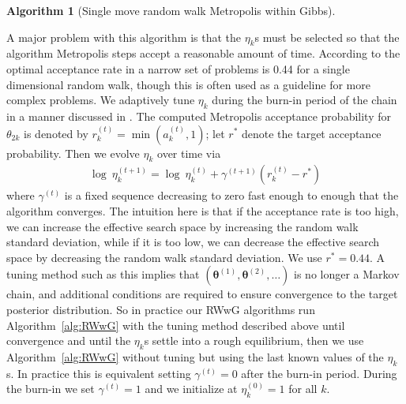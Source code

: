 \documentclass[12pt]{article}
\newtheorem{alg}{Algorithm}
\begin{document}
\begin{appendix}
\begin{alg}[Single move random walk Metropolis within Gibbs]
\begin{enumerate}
\begin{itemize}
\end{itemize}
\end{enumerate}
\end{alg}
A major problem with this algorithm is that the $\eta_k$s must be selected so that the algorithm Metropolis steps accept a reasonable amount of time. According to \citet{gelman1996efficient} the optimal acceptance rate in a narrow set of problems is 0.44 for a single dimensional random walk, though this is often used as a guideline for more complex problems. We adaptively tune $\eta_k$ during the burn-in period of the chain in a manner discussed in \citet{andrieu2008tutorial}. The computed Metropolis acceptance probability for $\theta_{2k}$ is denoted by $r_{k}^{(t)} = \min(a_k^{(t)}, 1)$; let $r^*$ denote the target acceptance probability. Then we evolve $\eta_k$ over time via
\begin{align*}
\log\ \eta_{k}^{(t+1)} = \log\ \eta_{k}^{(t)} + \gamma^{(t+1)}(r_k^{(t)} - r^*)
\end{align*}
where $\gamma^{(t)}$ is a fixed sequence decreasing to zero fast enough to enough that the algorithm converges. The intuition here is that if the acceptance rate is too high, we can increase the effective search space by increasing the random walk standard deviation, while if it is too low, we can decrease the effective search space by decreasing the random walk standard deviation. We use $r^*=0.44$. A tuning method such as this implies that $(\bm{\theta}^{(1)}, \bm{\theta}^{(2)},\dots)$ is no longer a Markov chain, and additional conditions are required to ensure convergence to the target posterior distribution. So in practice our RWwG algorithms run Algorithm~\ref{alg:RWwG} with the tuning method described above until convergence and until the $\eta_k$s settle into a rough equilibrium, then we use Algorithm~\ref{alg:RWwG} without tuning but using the last known values of the $\eta_k$s. In practice this is equivalent setting $\gamma^{(t)}=0$ after the burn-in period. During the burn-in we set $\gamma^{(t)}=1$ and we initialize at $\eta_k^{(0)}=1$ for all $k$.


\end{appendix}
\end{document}
